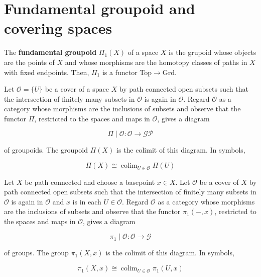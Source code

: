 

\section{Fundamental groupoid and covering spaces}



The \textbf{fundamental groupoid} $\Pi_1(X)$ of a space $X$ is the grupoid whose objects are the points of $X$ and whose morphisms are the homotopy classes of paths in $X$ with fixed endpoints. Then, $\Pi_1$ is a functor Top$\rightarrow$Grd.\\

\begin{theo}
Let $\mathscr{O}=\{U\}$ be a cover of a space $X$ by path connected open subsets such that the intersection of finitely many subsets in $\mathscr{O}$ is again in $\mathscr{O}$. Regard $\mathscr{O}$ as a category whose morphisms are the inclusions of subsets and observe that the functor $\Pi$, restricted to the spaces and maps in $\mathscr{O}$, gives a diagram

$$
\Pi \mid \mathscr{O}: \mathscr{O} \longrightarrow \mathscr{G} \mathscr{P}
$$

of groupoids. The groupoid $\Pi(X)$ is the colimit of this diagram. In symbols,

$$
\Pi(X) \cong \operatorname{colim}_{U \in \mathscr{O}} \Pi(U)
$$

\end{theo}

\begin{theo}
    Let $X$ be path connected and choose a basepoint $x \in X$. Let $\mathscr{O}$ be a cover of $X$ by path connected open subsets such that the intersection of finitely many subsets in $\mathscr{O}$ is again in $\mathscr{O}$ and $x$ is in each $U \in \mathscr{O}$. Regard $\mathscr{O}$ as a category whose morphisms are the inclusions of subsets and observe that the functor $\pi_1(-, x)$, restricted to the spaces and maps in $\mathcal{O}$, gives a diagram
    
    $$
    \pi_1 \mid \mathscr{O}: \mathscr{O} \longrightarrow \mathscr{G}
    $$
    
    of groups. The group $\pi_1(X, x)$ is the colimit of this diagram. In symbols,
    
    $$
    \pi_1(X, x) \cong \operatorname{colim}_{U \in \mathscr{O}} \pi_1(U, x)
    $$
    
\end{theo}

